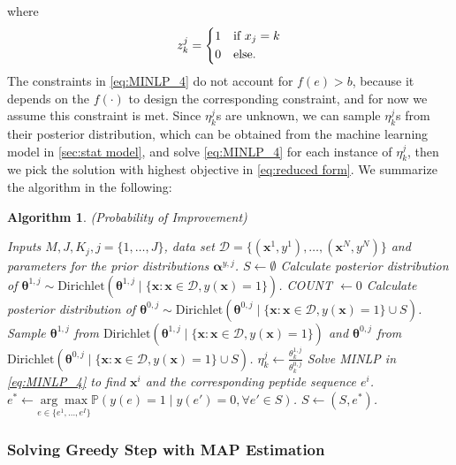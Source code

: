\documentclass[11pt]{article}
\newcommand{\Prob}{\mathbb{P}}
\newtheorem{Algorithm}{Algorithm}
\begin{document}
where
\begin{equation*}
z^j_k = \begin{dcases}
        1 & \text{if $x_j = k$}\\
        0 & \text{else}.
\end{dcases}
\end{equation*}
The constraints in \eqref{eq:MINLP_4} do not account for $f(e) > b$, because it depends on
the $f(\cdot)$ to design the corresponding constraint, and for now we assume this
constraint is met. Since $\eta^j_k$s are unknown, we can sample $\eta^j_k$s from their posterior 
distribution, which can be obtained from the machine learning model in \ref{sec:stat model},
and solve \eqref{eq:MINLP_4} for each instance of $\eta^j_k$, then we pick
the solution with highest objective in \eqref{eq:reduced form}. We summarize 
the algorithm in the following:
\begin{Algorithm}(Probability of Improvement) \label{algo1}
\begin{algorithmic}[1]
  \REQUIRE Inputs $M, J, K_j, j = \{1, \ldots, J\}$, data set $\mathcal{D} = 
  \{(\bm{x}^1, y^1), \ldots, (\bm{x}^N, y^N)\}$ and parameters for the prior 
  distributions $\bm{\alpha}^{y, j}$.
  \STATE $S \leftarrow \emptyset $
  \STATE Calculate posterior distribution of $\bm{\theta}^{1, j} \sim 
  \text{Dirichlet} (\bm{\theta}^{1, j} \mid \{\bm{x}: \bm{x} \in \mathcal{D}, 
  y(\bm{x}) = 1\})$.
    \STATE COUNT $\leftarrow 0$
    \STATE Calculate posterior distribution of $\bm{\theta}^{0, j} \sim 
    \text{Dirichlet} (\bm{\theta}^{0, j} \mid \{\bm{x}: \bm{x} \in \mathcal{D}, 
    y(\bm{x}) = 1\} \cup S)$.
      \STATE Sample $\bm{\theta}^{1, j}$ from $\text{Dirichlet} (\bm{\theta}^{1, j} 
      \mid \{\bm{x}: \bm{x} \in \mathcal{D}, y(\bm{x}) = 1\})$ and $\bm{\theta}^{0, j}$
      from $\text{Dirichlet} (\bm{\theta}^{0, j} \mid \{\bm{x}: \bm{x} \in \mathcal{D}, 
      y(\bm{x}) = 1\} \cup S)$.
      \STATE $\eta^j_k \leftarrow \frac{\theta^{1, j}_k}{\theta^{0, j}_k}$
      \STATE Solve MINLP in \eqref{eq:MINLP_4} to find $\bm{x}^i$ and the corresponding
      peptide sequence $e^i$.
    \ENDFOR
    \STATE $e^* \leftarrow \underset{e \in \{e^1, \ldots, e^I\}}
    {\arg \max} \Prob (y(e) = 1 \mid y(e') = 0, \forall e' \in S)$.
    \STATE $S \leftarrow (S, e^*)$.
  \ENDFOR
\end{algorithmic}
\end{Algorithm}

\subsubsection{Solving Greedy Step with MAP Estimation}
\end{document}
